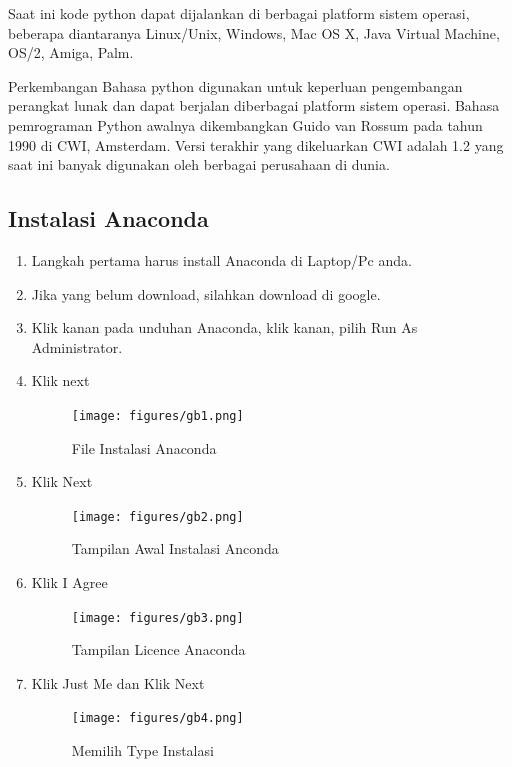 Saat ini kode python dapat dijalankan di berbagai platform sistem operasi, beberapa diantaranya Linux/Unix, Windows, Mac OS X, Java Virtual Machine, OS/2, Amiga, Palm.

Perkembangan Bahasa python digunakan untuk keperluan pengembangan perangkat lunak dan dapat berjalan diberbagai platform sistem operasi.
Bahasa pemrograman Python awalnya dikembangkan Guido van Rossum pada tahun 1990 di CWI, Amsterdam. Versi terakhir yang dikeluarkan CWI adalah 1.2 yang saat ini banyak digunakan oleh berbagai perusahaan di dunia.

\subsection{Instalasi Anaconda}
\begin{enumerate}
    \item Langkah pertama harus install Anaconda di Laptop/Pc anda.
    \item Jika yang belum download, silahkan download di google.
    \item Klik kanan pada unduhan Anaconda, klik kanan, pilih Run As Administrator.
    \item Klik next
    \begin{figure}[!htbp]
        \centering
        \texttt{[image: figures/gb1.png]}
        \caption{File Instalasi Anaconda}
        \label{File}
        \end{figure}

    \item Klik Next
    \begin{figure}[!htbp]
        \centering
        \texttt{[image: figures/gb2.png]}
        \caption{Tampilan Awal Instalasi Anconda}
        \label{Awal}
        \end{figure}

    \item Klik I Agree
    \begin{figure}[!htbp]
        \centering
        \texttt{[image: figures/gb3.png]}
        \caption{Tampilan Licence Anaconda}
        \label{Licence}
        \end{figure}

    \item Klik Just Me dan Klik Next
    \begin{figure}[!htbp]
        \centering
        \texttt{[image: figures/gb4.png]}
        \caption{Memilih Type Instalasi}
        \label{Type}
        \end{figure}


\end{enumerate}
